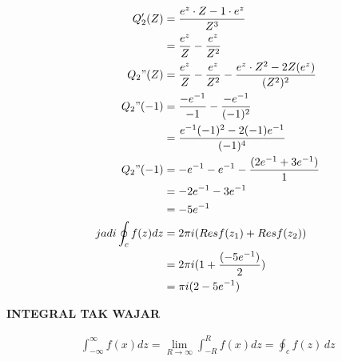 \documentclass{article}
\begin{document}
\begin{align}
    Q_2'(Z)             & = \dfrac{e^z \cdot Z-1 \cdot e^z}{Z^3}
    \nonumber                                                                                            \\
                        & = \dfrac{e^z}{Z} - \dfrac{e^z}{Z^2}
    \nonumber                                                                                            \\
    Q_2"(Z)             & = \dfrac{e^z}{Z} - \dfrac{e^z}{Z^2} - \dfrac{e^z \cdot Z^2 - 2Z(e^z)}{(Z^2)^2}
    \nonumber                                                                                            \\
    Q_2"(-1)            & = \dfrac{-e^{-1}}{-1} - \dfrac{-e^{-1}}{(-1)^2}
    \nonumber                                                                                            \\
                        & = \dfrac{e^{-1}(-1)^2-2(-1)e^{-1}}{(-1)^4}
    \nonumber                                                                                            \\
    Q_2"(-1)            & = -e^{-1} - e^{-1} - \dfrac{(2e^{-1} + 3e^{-1})}{1}
    \nonumber                                                                                            \\
                        & = -2e^{-1} - 3e^{-1}
    \nonumber                                                                                            \\
                        & = -5e^{-1}
    \nonumber                                                                                            \\
    jadi \oint_c f(z)dz & = 2\pi i(Res f(z_1) + Res f(z_2))
    \nonumber                                                                                            \\
                        & = 2\pi i(1+\dfrac{(-5e^{-1})}{2})
    \nonumber                                                                                            \\
                        & = \pi i (2-5e^{-1})
    \nonumber
\end{align}



\newpage
\begin{center}
    \textbf{INTEGRAL TAK WAJAR}
\end{center}
\begin{align}
    \boxed{\int_{- \infty}^{\infty} f(x) dz = \lim_{R \to \infty} \int_{-R}^{R} f(x) dz = \oint_c f(z)\,dz}
    \nonumber
\end{align}
\end{document}
